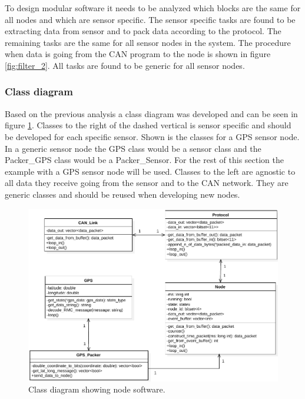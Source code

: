 To design modular software it needs to be analyzed which blocks are the same for all nodes and which are sensor specific.
The sensor specific tasks are found to be extracting data from sensor and to pack data according to the protocol.
The remaining tasks are the same for all sensor nodes in the system. 
The procedure when data is going from the CAN program to the node is shown in figure \ref{fig:filter_2}.
All tasks are found to be generic for all sensor nodes.

\subsubsection*{Class diagram}
Based on the previous analysis a class diagram was developed and can be seen in figure \ref{fig:node_class_diagram}.
Classes to the right of the dashed vertical is sensor specific and should be developed for each specific sensor.
Shown is the classes for a GPS sensor node. 
In a generic sensor node the GPS class would be a sensor class and the Packer\_GPS class would be a Packer\_Sensor.
For the rest of this section the example with a GPS sensor node will be used.
Classes to the left are agnostic to all data they receive going from the sensor and to the CAN network.
They are generic classes and should be reused when developing new nodes.

\begin{figure}[!h]
\centering
\includegraphics[width=1\textwidth]{graphics/ClassDiagram_NodeSimple}
\caption{Class diagram showing node software.}
\label{fig:node_class_diagram}
\end{figure}


